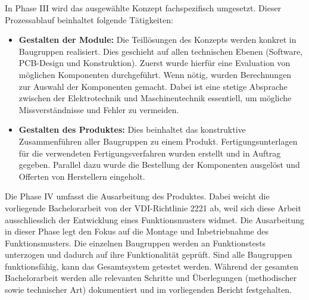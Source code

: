 In Phase III wird das ausgewählte Konzept fachspezifisch umgesetzt.  Dieser Prozessablauf beinhaltet folgende Tätigkeiten: 
\begin{itemize}
	\item \textbf{Gestalten der Module:} Die Teillösungen des Konzepts werden konkret in Baugruppen realisiert. Dies geschieht auf allen technischen Ebenen (Software, PCB-Design und Konstruktion). Zuerst wurde hierfür eine Evaluation von möglichen Komponenten durchgeführt. Wenn nötig, wurden Berechnungen zur Auswahl der Komponenten gemacht. Dabei ist eine stetige Absprache zwischen der Elektrotechnik und Maschinentechnik essentiell, um mögliche Missverständnisse und Fehler zu vermeiden.
	
	\item \textbf{Gestalten des Produktes:} Dies beinhaltet das konstruktive Zusammenführen aller Baugruppen zu einem Produkt. Fertigungsunterlagen für die verwendeten Fertigungsverfahren wurden erstellt und in Auftrag gegeben. Parallel dazu wurde die Bestellung der Komponenten ausgelöst und Offerten von Herstellern eingeholt. 
\end{itemize}

Die Phase IV umfasst die Ausarbeitung des Produktes. Dabei weicht die vorliegende Bachelorarbeit von der VDI-Richtlinie 2221 ab, weil sich diese Arbeit ausschliesslich der Entwicklung eines Funktionsmusters widmet.
\newline
Die Ausarbeitung in dieser Phase legt den Fokus auf die Montage und Inbetriebnahme des Funktionsmusters. Die einzelnen Baugruppen werden an Funktionstests unterzogen und dadurch auf ihre Funktionalität geprüft. Sind alle Baugruppen funktionsfähig, kann das Gesamtsystem getestet werden.
\newline
Während der gesamten Bachelorarbeit werden alle relevanten Schritte und Überlegungen (methodischer sowie technischer Art) dokumentiert und im vorliegenden Bericht festgehalten.
